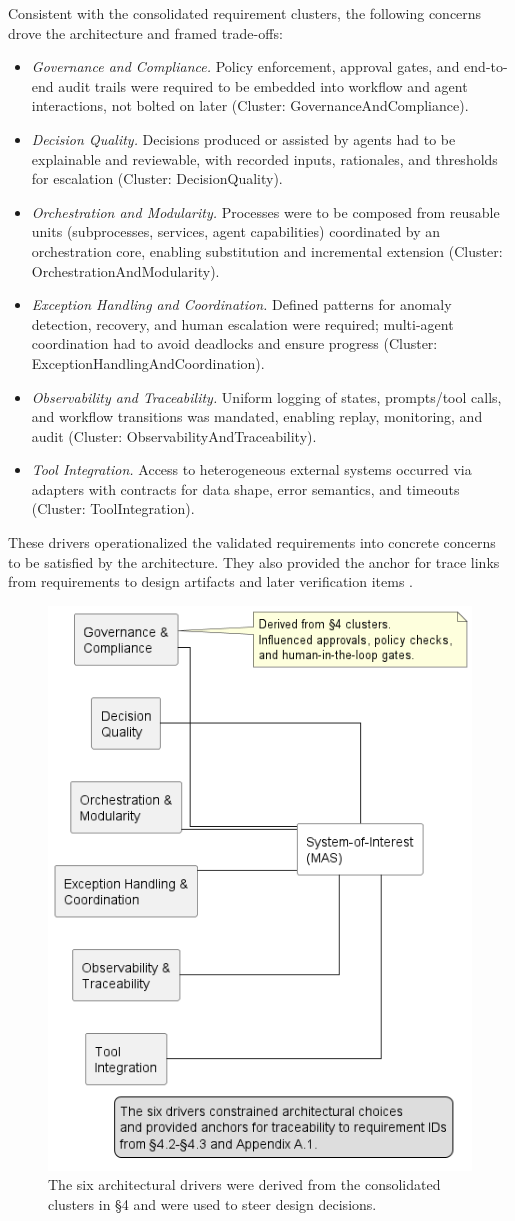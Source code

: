 Consistent with the consolidated requirement clusters, the following concerns drove the architecture and framed trade-offs:
\begin{itemize}
\item \emph{Governance and Compliance.} Policy enforcement, approval gates, and end-to-end audit trails were required to be embedded into workflow and agent interactions, not bolted on later (Cluster: GovernanceAndCompliance).
\item \emph{Decision Quality.} Decisions produced or assisted by agents had to be explainable and reviewable, with recorded inputs, rationales, and thresholds for escalation (Cluster: DecisionQuality).
\item \emph{Orchestration and Modularity.} Processes were to be composed from reusable units (subprocesses, services, agent capabilities) coordinated by an orchestration core, enabling substitution and incremental extension (Cluster: OrchestrationAndModularity).
\item \emph{Exception Handling and Coordination.} Defined patterns for anomaly detection, recovery, and human escalation were required; multi-agent coordination had to avoid deadlocks and ensure progress (Cluster: ExceptionHandlingAndCoordination).
\item \emph{Observability and Traceability.} Uniform logging of states, prompts/tool calls, and workflow transitions was mandated, enabling replay, monitoring, and audit (Cluster: ObservabilityAndTraceability).
\item \emph{Tool Integration.} Access to heterogeneous external systems occurred via adapters with contracts for data shape, error semantics, and timeouts (Cluster: ToolIntegration).
\end{itemize}
These drivers operationalized the validated requirements into concrete concerns to be satisfied by the architecture. They also provided the anchor for trace links from requirements to design artifacts and later verification items \parencite{IEEEStandard1990}.

\begin{figure}[t]
  \centering
  \includegraphics[width=0.5\linewidth]{ressources/MAS/figures/5_1b_drivers_overview.png}
  \caption{The six architectural drivers were derived from the consolidated clusters in §4 and were used to steer design decisions.}\label{fig:5.1b-drivers-overview}
\end{figure}

